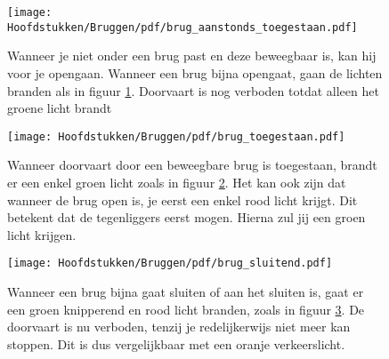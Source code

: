 \vspace{-0.75cm}
\begin{figure}[H]
	\centering
	\begin{minipage}[b]{0.18\textwidth}
		\texttt{[image: Hoofdstukken/Bruggen/pdf/brug\_aanstonds\_toegestaan.pdf]}
		\caption{}
		\label{pic:brug:aanstonds}
	\end{minipage}
	\hfill
	\begin{minipage}[t]{0.75\textwidth}
		\vspace{-2.5cm}
		Wanneer je niet onder een brug past en deze beweegbaar is, kan hij voor je opengaan. Wanneer een brug bijna opengaat, gaan de lichten branden als in figuur \ref{pic:brug:aanstonds}. Doorvaart is nog verboden totdat alleen het groene licht brandt
	\end{minipage}
\end{figure}
\vspace{-0.75cm}
\begin{figure}[H]
	\centering
	\begin{minipage}[b]{0.18\textwidth}
		\texttt{[image: Hoofdstukken/Bruggen/pdf/brug\_toegestaan.pdf]}
		\caption{}
		\label{pic:brug:vrij}
	\end{minipage}
	\hfill
	\begin{minipage}[t]{0.75\textwidth}
		\vspace{-2.5cm}
		Wanneer doorvaart door een beweegbare brug is toegestaan, brandt er een enkel groen licht zoals in figuur \ref{pic:brug:vrij}. Het kan ook zijn dat wanneer de brug open is, je eerst een enkel rood licht krijgt. Dit betekent dat de tegenliggers eerst mogen. Hierna zul jij een groen licht krijgen.
	\end{minipage}
\end{figure}
\vspace{-0.75cm}
\begin{figure}[H]
	\centering
	\begin{minipage}[b]{0.18\textwidth}
		\texttt{[image: Hoofdstukken/Bruggen/pdf/brug\_sluitend.pdf]}
		\caption{}
		\label{pic:brug:sluitend}
	\end{minipage}
	\hfill
	\begin{minipage}[t]{0.75\textwidth}
		\vspace{-2.5cm}
		Wanneer een brug bijna gaat sluiten of aan het sluiten is, gaat er een groen knipperend en rood licht branden, zoals in figuur \ref{pic:brug:sluitend}. De doorvaart is nu verboden, tenzij je redelijkerwijs niet meer kan stoppen. Dit is dus vergelijkbaar met een oranje verkeerslicht.
	\end{minipage}
\end{figure}
